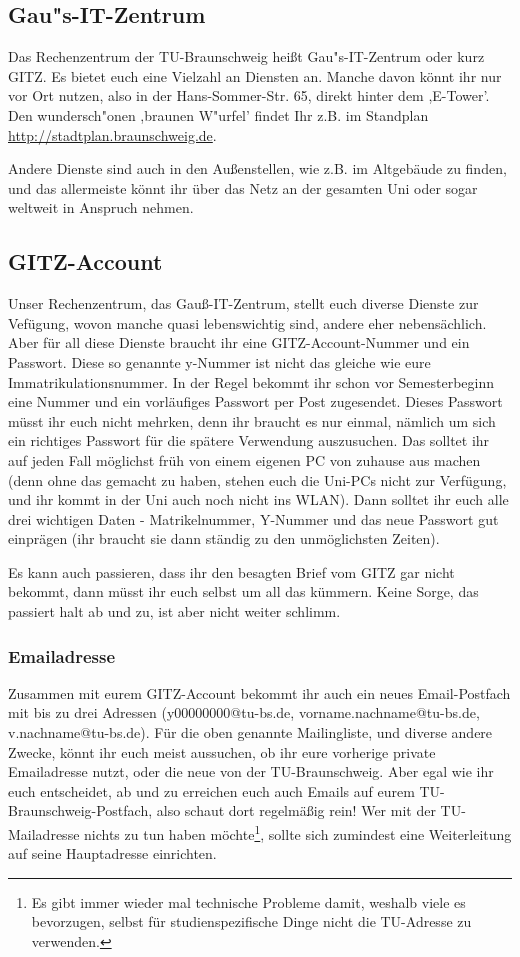 \begin{multicols}{2}
\subsection{Gau"s-IT-Zentrum}
	Das Rechenzentrum der TU-Braunschweig heißt Gau"s-IT-Zentrum oder kurz GITZ. Es bietet euch eine Vielzahl an Diensten an. Manche davon könnt ihr nur vor Ort nutzen, also in der Hans-Sommer-Str. 65, direkt hinter dem ,E-Tower'. Den wundersch"onen ,braunen W"urfel' findet Ihr z.B. im Standplan \url{http://stadtplan.braunschweig.de}.

	Andere Dienste sind auch in den Außenstellen, wie z.B. im Altgebäude zu finden, und das allermeiste könnt ihr über das Netz an der gesamten Uni oder sogar weltweit in Anspruch nehmen.

\subsection{GITZ-Account}
	Unser Rechenzentrum, das Gauß-IT-Zentrum, stellt euch diverse Dienste zur Vefügung, wovon manche quasi lebenswichtig sind, andere eher nebensächlich. Aber für all diese Dienste braucht ihr eine GITZ-Account-Nummer und ein Passwort. Diese so genannte y-Nummer ist nicht das gleiche wie eure Immatrikulationsnummer. In der Regel bekommt ihr schon vor Semesterbeginn eine Nummer und ein vorläufiges Passwort per Post zugesendet. Dieses Passwort müsst ihr euch nicht mehrken, denn ihr braucht es nur einmal, nämlich um sich ein richtiges Passwort für die spätere Verwendung auszusuchen. Das solltet ihr auf jeden Fall möglichst früh von einem eigenen PC von zuhause aus machen (denn ohne das gemacht zu haben, stehen euch die Uni-PCs nicht zur Verfügung, und ihr kommt in der Uni auch noch nicht ins WLAN). Dann solltet ihr euch alle drei wichtigen Daten - Matrikelnummer, Y-Nummer und das neue Passwort gut einprägen (ihr braucht sie dann ständig zu den unmöglichsten Zeiten).

	Es kann auch passieren, dass ihr den besagten Brief vom GITZ  gar nicht bekommt, dann müsst ihr euch selbst um all das kümmern. Keine Sorge, das passiert halt ab und zu, ist aber nicht weiter schlimm.

	\subsubsection{Emailadresse}
		\label{todomailing}
		Zusammen mit eurem GITZ-Account bekommt ihr auch ein neues Email-Postfach mit bis zu drei Adressen (y00000000@tu-bs.de, vorname.nachname@tu-bs.de, v.nachname@tu-bs.de). Für die oben genannte Mailingliste, und diverse andere Zwecke, könnt ihr euch meist aussuchen, ob ihr eure vorherige private Emailadresse nutzt, oder die neue von der TU-Braunschweig. Aber egal wie ihr euch entscheidet, ab und zu erreichen euch auch Emails auf eurem TU-Braunschweig-Postfach, also schaut dort regelmäßig rein! Wer mit der TU-Mailadresse nichts zu tun haben möchte\footnote{Es gibt immer wieder mal technische Probleme damit, weshalb viele es bevorzugen, selbst für studienspezifische Dinge nicht die TU-Adresse zu verwenden.}, sollte sich zumindest eine Weiterleitung auf seine Hauptadresse einrichten.


\end{multicols}
